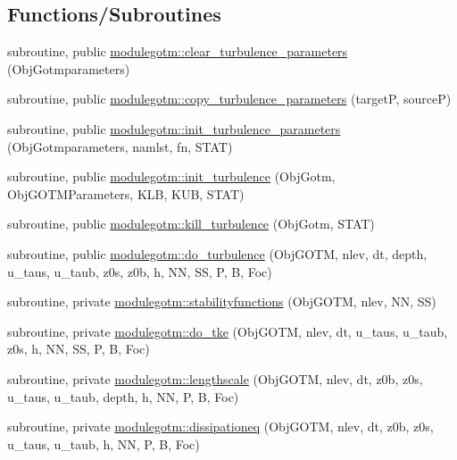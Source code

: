 \subsection*{Functions/\+Subroutines}
\begin{DoxyCompactItemize}
\item 
subroutine, public \mbox{\hyperlink{namespacemodulegotm_acc6ad2c4bea63b4d44a941b81fcbf402}{modulegotm\+::clear\+\_\+turbulence\+\_\+parameters}} (Obj\+Gotmparameters)
\item 
subroutine, public \mbox{\hyperlink{namespacemodulegotm_af408ddba849a968ba4867373805e4b3b}{modulegotm\+::copy\+\_\+turbulence\+\_\+parameters}} (targetP, sourceP)
\item 
subroutine, public \mbox{\hyperlink{namespacemodulegotm_a88820406e3c80bbfc120dbf96b66424b}{modulegotm\+::init\+\_\+turbulence\+\_\+parameters}} (Obj\+Gotmparameters, namlst, fn, S\+T\+AT)
\item 
subroutine, public \mbox{\hyperlink{namespacemodulegotm_a2bcdea4da65e0575591794282ca6ba41}{modulegotm\+::init\+\_\+turbulence}} (Obj\+Gotm, Obj\+G\+O\+T\+M\+Parameters, K\+LB, K\+UB, S\+T\+AT)
\item 
subroutine, public \mbox{\hyperlink{namespacemodulegotm_a52589088a0366839f7e6684a9917a71a}{modulegotm\+::kill\+\_\+turbulence}} (Obj\+Gotm, S\+T\+AT)
\item 
subroutine, public \mbox{\hyperlink{namespacemodulegotm_a4ca35153e188114f4f02fe276d302d14}{modulegotm\+::do\+\_\+turbulence}} (Obj\+G\+O\+TM, nlev, dt, depth, u\+\_\+taus, u\+\_\+taub, z0s, z0b, h, NN, SS, P, B, Foc)
\item 
subroutine, private \mbox{\hyperlink{namespacemodulegotm_a0e2f0ad43d12c00ed95b6fdef24dc5eb}{modulegotm\+::stabilityfunctions}} (Obj\+G\+O\+TM, nlev, NN, SS)
\item 
subroutine, private \mbox{\hyperlink{namespacemodulegotm_ae39109acd910c29deba62e83a6edce50}{modulegotm\+::do\+\_\+tke}} (Obj\+G\+O\+TM, nlev, dt, u\+\_\+taus, u\+\_\+taub, z0s, h, NN, SS, P, B, Foc)
\item 
subroutine, private \mbox{\hyperlink{namespacemodulegotm_a2d9e32d408a390b64575234c5dd95f62}{modulegotm\+::lengthscale}} (Obj\+G\+O\+TM, nlev, dt, z0b, z0s, u\+\_\+taus, u\+\_\+taub, depth, h, NN, P, B, Foc)
\item 
subroutine, private \mbox{\hyperlink{namespacemodulegotm_ac05dd8d50f9ddc2c286122142f8a400e}{modulegotm\+::dissipationeq}} (Obj\+G\+O\+TM, nlev, dt, z0b, z0s, u\+\_\+taus, u\+\_\+taub, h, NN, P, B, Foc)
\item 

\end{DoxyCompactItemize}
